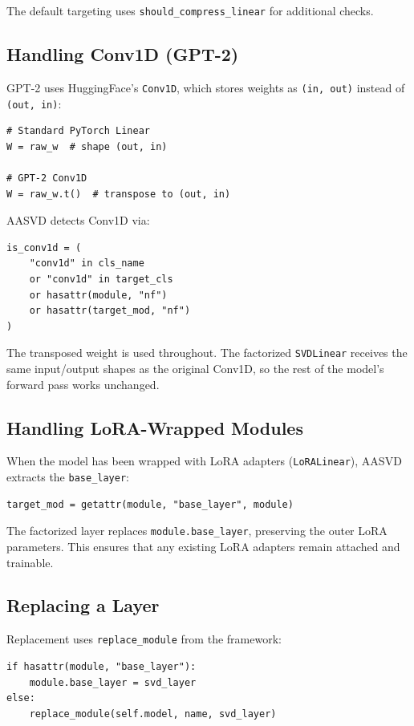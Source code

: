 The default targeting uses \texttt{should\_compress\_linear} for additional checks.

\subsection{Handling Conv1D (GPT-2)}

GPT-2 uses HuggingFace's \texttt{Conv1D}, which stores weights as \texttt{(in, out)} 
instead of \texttt{(out, in)}:

\begin{lstlisting}
# Standard PyTorch Linear
W = raw_w  # shape (out, in)

# GPT-2 Conv1D
W = raw_w.t()  # transpose to (out, in)
\end{lstlisting}

AASVD detects Conv1D via:

\begin{lstlisting}
is_conv1d = (
    "conv1d" in cls_name 
    or "conv1d" in target_cls 
    or hasattr(module, "nf") 
    or hasattr(target_mod, "nf")
)
\end{lstlisting}

The transposed weight is used throughout. The factorized \texttt{SVDLinear} 
receives the same input/output shapes as the original Conv1D, so the 
rest of the model's forward pass works unchanged.

\subsection{Handling LoRA-Wrapped Modules}

When the model has been wrapped with LoRA adapters (\texttt{LoRALinear}), AASVD 
extracts the \texttt{base\_layer}:

\begin{lstlisting}
target_mod = getattr(module, "base_layer", module)
\end{lstlisting}

The factorized layer replaces \texttt{module.base\_layer}, preserving the outer 
LoRA parameters. This ensures that any existing LoRA adapters remain 
attached and trainable.

\subsection{Replacing a Layer}

Replacement uses \texttt{replace\_module} from the framework:

\begin{lstlisting}
if hasattr(module, "base_layer"):
    module.base_layer = svd_layer
else:
    replace_module(self.model, name, svd_layer)
\end{lstlisting}

